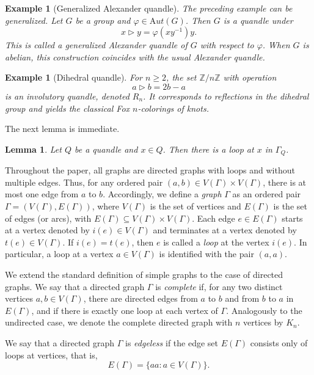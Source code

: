 \documentclass[english,11pt]{amsart}
\newtheorem{Lemma}[Theorem]{Lemma}
\newtheorem{Example}[Theorem]{Example}
\newcommand{\Aut}{{\mathrm Aut}}
\begin{document}
\begin{Example}[Generalized Alexander quandle]
The preceding example can be generalized. Let $G$ be a group and $\varphi \in \Aut(G)$. Then $G$ is a quandle under
\[
x \rhd y = \varphi(xy^{-1})y.
\]
This is called a generalized Alexander quandle of $G$ with respect to $\varphi$. When 
$G$ is abelian, this construction coincides with the usual Alexander quandle.
\end{Example}

\begin{Example}[Dihedral quandle]
For $n\ge 2$, the set $\mathbb{Z}/n\mathbb{Z}$ with operation
\[
a \rhd b = 2b-a
\]
is an involutory quandle, denoted $R_n$. It corresponds to reflections in the dihedral group and yields the classical Fox $n$-colorings of knots.
\end{Example}


The next lemma is immediate.

\begin{Lemma}
   Let $Q$ be a quandle and $x \in Q$. Then there is a loop at $x$ in $\Gamma_Q$.
\end{Lemma}

Throughout the paper, all graphs are directed graphs with loops and without multiple edges. Thus, for any ordered pair $(a,b) \in V(\Gamma)\times V(\Gamma)$, there is at most one edge
from $a$ to $b$. Accordingly, we define a \emph{graph} $\Gamma$ as an ordered pair $\Gamma = (V(\Gamma), E(\Gamma))$, where $V(\Gamma)$ is the set of vertices and $E(\Gamma)$ is the set of edges (or arcs),
with $E(\Gamma) \subseteq V(\Gamma) \times V(\Gamma).$
Each edge $e \in E(\Gamma)$ starts at a vertex denoted by $i(e) \in V(\Gamma)$ and terminates at a vertex denoted by $t(e) \in V(\Gamma)$.
If $i(e) = t(e)$, then $e$ is called a \emph{loop} at the vertex $i(e)$. In particular, a loop at a vertex $a \in V(\Gamma)$ is identified with the pair $(a,a)$.

We extend the standard definition of simple graphs to the case of directed graphs.
We say that a directed graph $\Gamma$ is \emph{complete} if, for any two distinct vertices
$a,b \in V(\Gamma)$, there are directed edges from $a$ to $b$ and from $b$ to $a$ in $E(\Gamma)$, and if there is exactly one loop at each vertex of $\Gamma$. Analogously to the undirected case, we denote the complete directed graph with $n$ vertices by $K_n$.

We say that a directed graph $\Gamma$ is \emph{edgeless} if the edge set $E(\Gamma)$
consists only of loops at vertices, that is,
\[
E(\Gamma)=\{aa : a \in V(\Gamma)\}.
\] 
\end{document}
